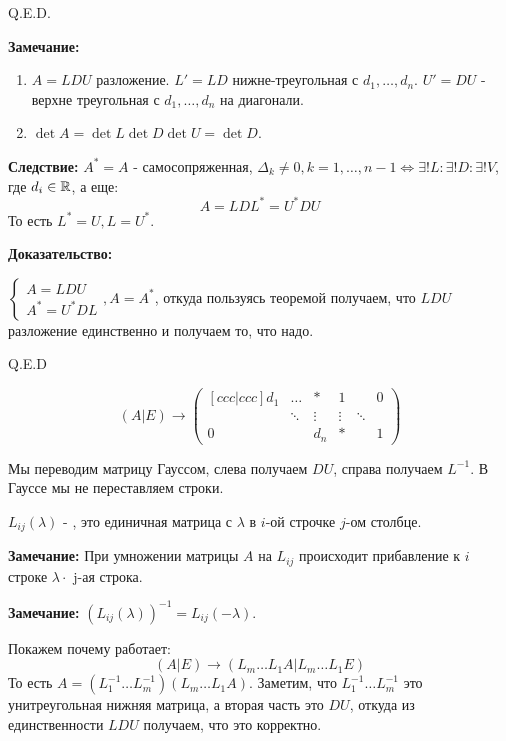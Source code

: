     
    \hfill Q.E.D.
    

\textbf{Замечание:}
\begin{enumerate}
    \item $A = LDU$ разложение. $L' =LD$ нижне-треугольная с $d_1,\ldots,d_n$. $U' = DU$ - верхне треугольная с $d_1,\ldots,d_n$ на диагонали.
    \item $\det A = \det L \det D  \det U = \det D$.

\end{enumerate}

\textbf{Следствие:} $A^* = A$  - самосопряженная, $\Delta_k \neq 0 , k = 1, \ldots, n-1 \Leftrightarrow \exists ! L : \exists! D : \exists! V$, где $d_i\in \mathbb{R}$, а еще:
$$A = LDL^* = U^*DU$$
То есть $L^* = U, L = U^*$.

\textbf{Доказательство:}

$\begin{cases}
    A = LDU\\
    A^* = U^*DL
\end{cases}, A = A^*$, откуда пользуясь теоремой получаем, что $LDU$ разложение единственно и получаем то, что надо.

\hfill Q.E.D


$$(A | E) \rightarrow{} \begin{pmatrix}[ccc|ccc]
    d_1 & \ldots & * & 1 &        & 0\\
     & \ddots &\vdots &  \vdots  &\ddots & \\
     0 & & d_n   & * & &1
\end{pmatrix}$$

Мы переводим матрицу Гауссом, слева получаем $DU$, справа получаем $L^{-1}$. В Гауссе мы не переставляем строки.

 $L_{ij}(\lambda)$ - , это единичная матрица с $\lambda$ в $i$-ой строчке $j$-ом столбце.

\textbf{Замечание:} При умножении матрицы $A$ на $L_{ij}$ происходит прибавление к $i$ строке $\lambda \cdot$ j-ая строка. 

\textbf{Замечание:} $(L_{ij}(\lambda))^{-1} = L_{ij}(-\lambda)$.

Покажем почему работает:
$$(A|E) \rightarrow{} (L_m\ldots L_1 A | L_m\ldots L_1 E)$$
То есть $A = (L_1^{-1}\ldots L_{m}^{-1})(L_m\ldots L_1A)$. Заметим, что $L_{1}^{-1}\ldots L_m^{-1}$ это унитреугольная нижняя матрица, а вторая часть это $DU$, откуда из единственности $LDU$ получаем, что это корректно.





